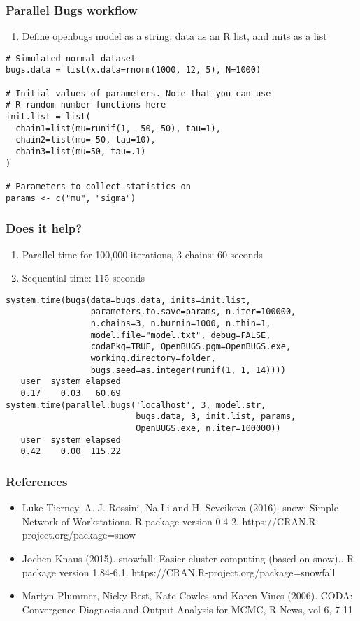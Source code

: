 \documentclass{beamer}
\begin{document}
\begin{frame}[fragile]
  \frametitle{Parallel Bugs workflow}
  
  \begin{enumerate}
    \item Define openbugs model as a string, data as an R list, and inits as a list
  \end{enumerate}

  \begin{verbatim}
# Simulated normal dataset
bugs.data = list(x.data=rnorm(1000, 12, 5), N=1000)

# Initial values of parameters. Note that you can use
# R random number functions here
init.list = list(
  chain1=list(mu=runif(1, -50, 50), tau=1),
  chain2=list(mu=-50, tau=10),
  chain3=list(mu=50, tau=.1)
)

# Parameters to collect statistics on
params <- c("mu", "sigma")
  \end{verbatim}
\end{frame}


\begin{frame}[fragile]
  \frametitle{Does it help?}
  
  \begin{enumerate}
    \item Parallel time for 100,000 iterations, 3 chains: 60 seconds
    \item Sequential time: 115 seconds
  \end{enumerate}

  \begin{verbatim}
system.time(bugs(data=bugs.data, inits=init.list, 
                 parameters.to.save=params, n.iter=100000, 
                 n.chains=3, n.burnin=1000, n.thin=1,
                 model.file="model.txt", debug=FALSE, 
                 codaPkg=TRUE, OpenBUGS.pgm=OpenBUGS.exe,
                 working.directory=folder,
                 bugs.seed=as.integer(runif(1, 1, 14))))
   user  system elapsed 
   0.17    0.03   60.69
system.time(parallel.bugs('localhost', 3, model.str, 
                          bugs.data, 3, init.list, params, 
                          OpenBUGS.exe, n.iter=100000))
   user  system elapsed 
   0.42    0.00  115.22 
  \end{verbatim}
\end{frame}

\begin{frame}
  \frametitle{References}
    \begin{itemize}
      \item Luke Tierney, A. J. Rossini, Na Li and H. Sevcikova (2016). snow: Simple Network of Workstations. R package version 0.4-2. https://CRAN.R-project.org/package=snow
      \item Jochen Knaus (2015). snowfall: Easier cluster computing (based on snow).. R package version 1.84-6.1. https://CRAN.R-project.org/package=snowfall
      \item Martyn Plummer, Nicky Best, Kate Cowles and Karen Vines (2006). CODA: Convergence Diagnosis and Output Analysis for MCMC, R News, vol 6, 7-11
    \end{itemize}
\end{frame}
\end{document}
